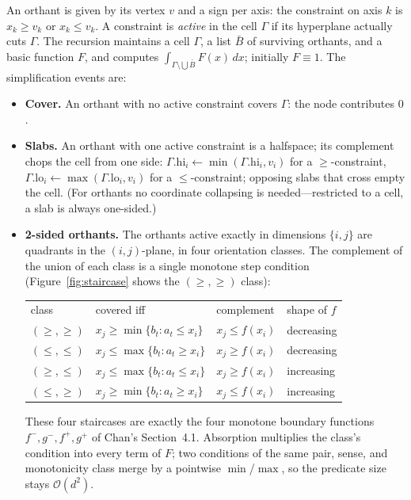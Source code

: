 \documentclass[11pt,a4paper]{article}
\theoremstyle{remark}
\newcommand{\Oh}{\mathcal{O}}
\begin{document}
An orthant is given by its vertex $v$ and a sign per axis: the constraint on
axis $k$ is $x_k\ge v_k$ or $x_k\le v_k$.  A constraint is \emph{active} in
the cell $\Gamma$ if its hyperplane actually cuts $\Gamma$.  The recursion
maintains a cell $\Gamma$, a list $\bar B$ of surviving orthants, and a
basic function $F$, and computes
$\int_{\Gamma\setminus\bigcup\bar B} F(x)\,dx$; initially $F\equiv 1$.  The
simplification events are:
\begin{itemize}\itemsep2pt
\item \textbf{Cover.} An orthant with no active constraint covers $\Gamma$:
  the node contributes $0$.
\item \textbf{Slabs.} An orthant with one active constraint is a halfspace;
  its complement chops the cell from one side:
  $\Gamma.\mathrm{hi}_i\leftarrow\min(\Gamma.\mathrm{hi}_i,v_i)$ for a
  $\ge$-constraint, $\Gamma.\mathrm{lo}_i\leftarrow\max(\Gamma.\mathrm{lo}_i,v_i)$
  for a $\le$-constraint; opposing slabs that cross empty the cell.  (For
  orthants no coordinate collapsing is needed---restricted to a cell, a slab
  is always one-sided.)
\item \textbf{2-sided orthants.} The orthants active exactly in dimensions
  $\{i,j\}$ are quadrants in the $(i,j)$-plane, in four orientation classes.
  The complement of the union of each class is a single monotone step
  condition (Figure~\ref{fig:staircase} shows the $(\ge,\ge)$ class):
  \begin{center}
  \begin{tabular}{@{}llll@{}}
  class & covered iff & complement & shape of $f$\\
  $(\ge,\ge)$ & $x_j\ge\min\{b_t: a_t\le x_i\}$ & $x_j\le f(x_i)$ & decreasing\\
  $(\le,\le)$ & $x_j\le\max\{b_t: a_t\ge x_i\}$ & $x_j\ge f(x_i)$ & decreasing\\
  $(\ge,\le)$ & $x_j\le\max\{b_t: a_t\le x_i\}$ & $x_j\ge f(x_i)$ & increasing\\
  $(\le,\ge)$ & $x_j\ge\min\{b_t: a_t\ge x_i\}$ & $x_j\le f(x_i)$ & increasing\\
  \end{tabular}
  \end{center}
  These four staircases are exactly the four monotone boundary functions
  $f^-,g^-,f^+,g^+$ of Chan's Section~4.1.  Absorption multiplies the
  class's condition into every term of $F$; two conditions of the same pair,
  sense, and monotonicity class merge by a pointwise $\min$/$\max$, so the
  predicate size stays $\Oh(d^2)$.
\end{itemize}
\end{document}
